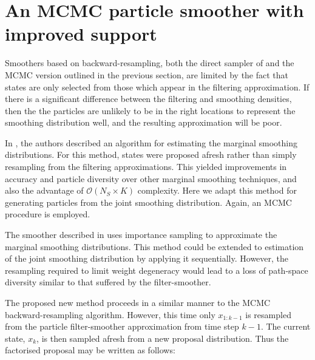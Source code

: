 \documentclass[journal]{IEEEtran}
\begin{document}
\section{An MCMC particle smoother with improved support} \label{sec:new_state_smoother}

Smoothers based on backward-resampling, both the direct sampler of \cite{Godsill2004} and the MCMC version outlined in the previous section, are limited by the fact that states are only selected from those which appear in the filtering approximation. If there is a significant difference between the filtering and smoothing densities, then the the particles are unlikely to be in the right locations to represent the smoothing distribution well, and the resulting approximation will be poor.

In \cite{Fearnhead2010}, the authors described an algorithm for estimating the marginal smoothing distributions. For this method, states were proposed afresh rather than simply resampling from the filtering approximations. This yielded improvements in accuracy and particle diversity over other marginal smoothing techniques, and also the advantage of $\mathcal{O}(N_S \times K)$ complexity. Here we adapt this method for generating particles from the joint smoothing distribution. Again, an MCMC procedure is employed.


The smoother described in \cite{Fearnhead2010} uses importance sampling to approximate the marginal smoothing distributions. This method could be extended to estimation of the joint smoothing distribution by applying it sequentially. However, the resampling required to limit weight degeneracy would lead to a loss of path-space diversity similar to that suffered by the filter-smoother.

The proposed new method proceeds in a similar manner to the MCMC backward-resampling algorithm. However, this time only $x_{1:k-1}$ is resampled from the particle filter-smoother approximation from time step $k-1$. The current state, $x_k$, is then sampled afresh from a new proposal distribution. Thus the factorised proposal may be written as follows:
\end{document}
